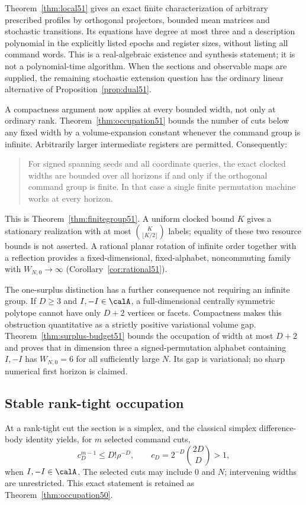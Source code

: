 Theorem~\ref{thm:local51} gives an exact finite characterization of
arbitrary prescribed profiles by orthogonal projectors, bounded mean
matrices and stochastic transitions. Its equations have degree at
most three and a description polynomial in the explicitly listed
epochs and register sizes, without listing all command words. This
is a real-algebraic existence and synthesis statement; it is not a
polynomial-time algorithm. When the sections and observable maps
are supplied, the remaining stochastic extension question has the
ordinary linear alternative of Proposition~\ref{prop:dual51}.

A compactness argument now applies at every bounded width, not only
at ordinary rank. Theorem~\ref{thm:occupation51} bounds the number
of cuts below any fixed width by a volume-expansion constant whenever
the command group is infinite. Arbitrarily larger intermediate
registers are permitted. Consequently:
\begin{quote}
For signed spanning seeds and all coordinate queries, the exact
clocked widths are bounded over all horizons if and only if the
orthogonal command group is finite. In that case a single finite
permutation machine works at every horizon.
\end{quote}
This is Theorem~\ref{thm:finitegroup51}. A uniform clocked bound $K$
gives a stationary realization with at most
$\binom K{\lfloor K/2\rfloor}$ labels; equality of these two resource
bounds is not asserted. A rational planar rotation of infinite order
together with a reflection provides a fixed-dimensional,
fixed-alphabet, noncommuting family with $W_{N,0}\to\infty$
(Corollary~\ref{cor:rational51}).

The one-surplus distinction has a further consequence not requiring
an infinite group. If $D\ge3$ and $I,-I\in\calA$, a full-dimensional
centrally symmetric polytope cannot have only $D+2$ vertices or
facets. Compactness makes this obstruction quantitative as a strictly
positive variational volume gap. Theorem~\ref{thm:surplus-budget51}
bounds the occupation of width at most $D+2$ and proves that in
dimension three a signed-permutation alphabet containing $I,-I$
has $W_{N,0}=6$ for all sufficiently large $N$. Its gap is
variational; no sharp numerical first horizon is claimed.

\subsection{Stable rank-tight occupation}
At a rank-tight cut the section is a simplex, and the classical
simplex difference-body identity yields, for $m$ selected command
cuts,
\begin{equation}\label{eq:intro-budget50}
 c_D^{m-1}\le D!\rho^{-D},\qquad
 c_D=2^{-D}\binom{2D}{D}>1,
\end{equation}
when $I,-I\in\calA$. The selected cuts may include $0$ and $N$;
intervening widths are unrestricted. This exact statement is retained
as Theorem~\ref{thm:occupation50}.

